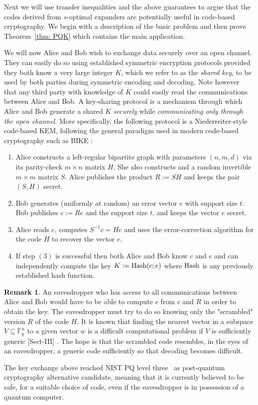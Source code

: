 \documentclass[12pt]{amsart}
\theoremstyle{definition}
\newtheorem{remark}[lemma]{Remark}
\newcommand{\FF}{\ensuremath{\mathbb{F}}}
\newcommand{\1}{\ensuremath{\mathbb{1}}}
\begin{document}
Next we will use transfer inequalities and the above guarantees to argue that the codes derived from $s$-optimal expanders are potentially useful in code-based cryptography. We begin with a description of the basic problem and then prove Theorem~\ref{thm: PQK} which contains the main application.

We will now Alice and Bob wish to exchange data securely over an open channel. They can easily do so using established symmetric encryption protocols provided they both know a very large integer $K$, which we refer to as the \emph{shared key}, to be used by both parties during symmetric encoding and decoding.  Note however that any third party with knowledge of $K$ could easily read the communications between Alice and Bob.
A key-sharing protocol is a mechanism through which Alice and Bob generate a shared $K$ \emph{securely} while \emph{communicating only through the open channel}. More specifically, the following protocol is a
Niederreiter-style code-based KEM, following the general
paradigm used in modern code-based cryptography such as
BIKE \cite{BIKE20}:

\begin{enumerate}
\item Alice constructs a left-regular bipartite graph with parameters $(n,m,d)$ via its parity-check $m\times n$ matrix $H$. She also constructs and a random invertible $m\times m$ matrix $S$. Alice publishes the product $R:=SH$ and keeps the pair $(S,H)$ secret.
\item Bob generates (uniformly at random) an error vector $e$ with support size $t$. Bob publishes $c:=Re$ and the support size $t$, and keeps the vector $e$ secret.
\item Alice reads $c$, computes $S^{-1}c = He$ and uses the error-correction algorithm for the code $H$ to recover the vector $e$.

\item If step $(3)$ is successful then both Alice and Bob know $c$ and $e$ and can independently compute the key $K:={\rm Hash}(c;e)$ where ${\rm Hash}$ is any previously established hash function.
\end{enumerate}
 
\begin{remark} An eavesdropper who has access to all communications between Alice and Bob would have to be able to compute $e$ from $c$ and $R$ in order to obtain the key. The eavesdropper must try to do so knowing only the "scrambled" version $R$ of the code $H$. It is known that finding the nearest vector in a subspace $V\subseteq \FF_q^n$ to a given vector $w$ is a difficult computational problem if $V$ is sufficiently generic \cite{Ber}[Sect-III] . The hope is that the scrambled code resembles, in the eyes of an eavesdropper, a generic code sufficiently so that decoding becomes difficult.

The key exchange above reached NIST PQ level three~\cite{BIKE20} as post-quantum cryptography alternative candidate, meaning that it is currently believed to be safe, for a suitable choice of code, even if the eavesdropper is in possession of a quantum computer. \end{remark} 
  
\end{document}

